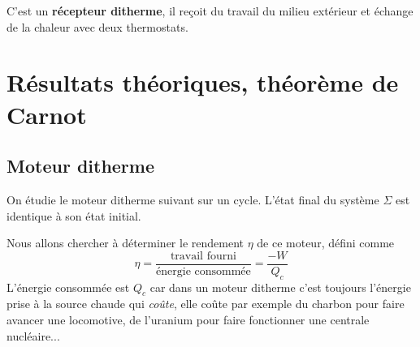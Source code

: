 \documentclass{cours}
\begin{document}
\begin{center}
\end{center}

C'est un \textbf{récepteur ditherme}, il reçoit du travail du milieu extérieur et échange de la chaleur avec deux thermostats. 
\section{Résultats théoriques, théorème de Carnot}%
\label{sec:resultats_theoriques_theoreme_de_carnot}
\subsection{Moteur ditherme}%
\label{sub:moteur_ditherme}

On étudie le moteur ditherme suivant sur un cycle. L'état final du système $\Sigma$ est identique à son état initial.

\begin{center}
\end{center}

Nous allons chercher à déterminer le rendement $\eta$ de ce moteur, défini comme
\begin{equation}
  \eta = \frac{\text{travail fourni}}{\text{énergie consommée}} = \frac{-W}{Q_c}
\end{equation}
L'énergie consommée est $Q_c$ car dans un moteur ditherme c'est toujours l'énergie prise à la source chaude qui \emph{coûte}, elle coûte par exemple du charbon pour faire avancer une locomotive, de l'uranium pour faire fonctionner une centrale nucléaire...
\end{document}
